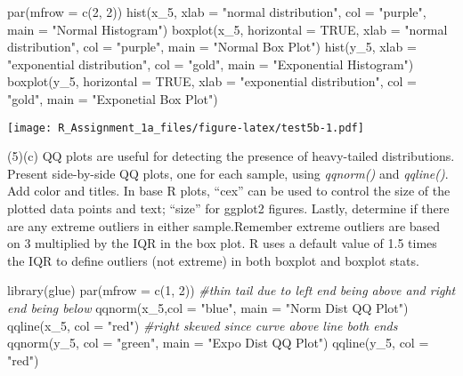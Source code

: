 \documentclass[
]{article}
\newenvironment{Shaded}{\begin{snugshade}}{\end{snugshade}}
\newcommand{\AttributeTok}[1]{\textcolor[rgb]{0.77,0.63,0.00}{#1}}
\newcommand{\CommentTok}[1]{\textcolor[rgb]{0.56,0.35,0.01}{\textit{#1}}}
\newcommand{\ConstantTok}[1]{\textcolor[rgb]{0.00,0.00,0.00}{#1}}
\newcommand{\DecValTok}[1]{\textcolor[rgb]{0.00,0.00,0.81}{#1}}
\newcommand{\FunctionTok}[1]{\textcolor[rgb]{0.00,0.00,0.00}{#1}}
\newcommand{\NormalTok}[1]{#1}
\newcommand{\StringTok}[1]{\textcolor[rgb]{0.31,0.60,0.02}{#1}}
\begin{document}
\begin{Shaded}
\begin{Highlighting}[]
\FunctionTok{par}\NormalTok{(}\AttributeTok{mfrow =} \FunctionTok{c}\NormalTok{(}\DecValTok{2}\NormalTok{, }\DecValTok{2}\NormalTok{))}
\FunctionTok{hist}\NormalTok{(x\_5, }\AttributeTok{xlab =} \StringTok{"normal distribution"}\NormalTok{, }\AttributeTok{col =} \StringTok{"purple"}\NormalTok{, }\AttributeTok{main =} \StringTok{"Normal Histogram"}\NormalTok{)}
\FunctionTok{boxplot}\NormalTok{(x\_5, }\AttributeTok{horizontal =} \ConstantTok{TRUE}\NormalTok{, }\AttributeTok{xlab =} \StringTok{"normal distribution"}\NormalTok{, }\AttributeTok{col =} \StringTok{"purple"}\NormalTok{, }\AttributeTok{main =} \StringTok{"Normal Box Plot"}\NormalTok{)}
\FunctionTok{hist}\NormalTok{(y\_5, }\AttributeTok{xlab =} \StringTok{"exponential distribution"}\NormalTok{, }\AttributeTok{col =} \StringTok{"gold"}\NormalTok{, }\AttributeTok{main =} \StringTok{"Exponential Histogram"}\NormalTok{)}
\FunctionTok{boxplot}\NormalTok{(y\_5, }\AttributeTok{horizontal =} \ConstantTok{TRUE}\NormalTok{, }\AttributeTok{xlab =} \StringTok{"exponential distribution"}\NormalTok{, }\AttributeTok{col =} \StringTok{"gold"}\NormalTok{, }\AttributeTok{main =} \StringTok{"Exponetial Box Plot"}\NormalTok{)}
\end{Highlighting}
\end{Shaded}

\texttt{[image: R\_Assignment\_1a\_files/figure-latex/test5b-1.pdf]}

(5)(c) QQ plots are useful for detecting the presence of heavy-tailed
distributions. Present side-by-side QQ plots, one for each sample, using
\emph{qqnorm()} and \emph{qqline()}. Add color and titles. In base R
plots, ``cex'' can be used to control the size of the plotted data
points and text; ``size'' for ggplot2 figures. Lastly, determine if
there are any extreme outliers in either sample.Remember extreme
outliers are based on 3 multiplied by the IQR in the box plot. R uses a
default value of 1.5 times the IQR to define outliers (not extreme) in
both boxplot and boxplot stats.

\begin{Shaded}
\begin{Highlighting}[]
\FunctionTok{library}\NormalTok{(glue)}
\FunctionTok{par}\NormalTok{(}\AttributeTok{mfrow =} \FunctionTok{c}\NormalTok{(}\DecValTok{1}\NormalTok{, }\DecValTok{2}\NormalTok{))}
\CommentTok{\#thin tail due to left end being above and right end being below}
\FunctionTok{qqnorm}\NormalTok{(x\_5,}\AttributeTok{col =} \StringTok{"blue"}\NormalTok{, }\AttributeTok{main =} \StringTok{"Norm Dist QQ Plot"}\NormalTok{)}
\FunctionTok{qqline}\NormalTok{(x\_5, }\AttributeTok{col =} \StringTok{"red"}\NormalTok{)}
\CommentTok{\#right skewed since curve above line both ends}
\FunctionTok{qqnorm}\NormalTok{(y\_5, }\AttributeTok{col =} \StringTok{"green"}\NormalTok{, }\AttributeTok{main =} \StringTok{"Expo Dist QQ Plot"}\NormalTok{)}
\FunctionTok{qqline}\NormalTok{(y\_5, }\AttributeTok{col =} \StringTok{"red"}\NormalTok{)}
\end{Highlighting}
\end{Shaded}
\end{document}

